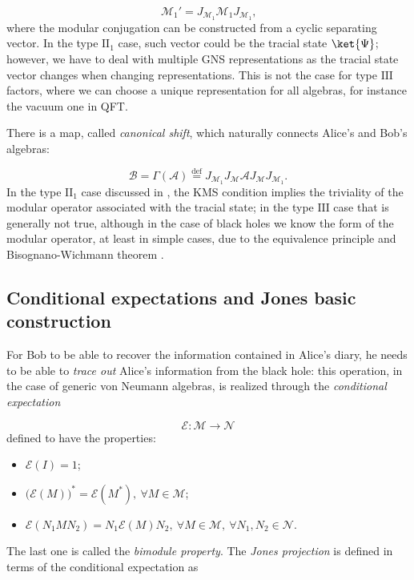 \documentclass[a4paper,11pt]{article}
\newcommand{\eqdef}{\overset{\mathrm{def}}{=}}
\begin{document}
\begin{equation}
    \mathcal{M}_1' = J_{\mathcal{M}_1} \mathcal{M}_1 J_{\mathcal{M}_1} \text{,}
    \label{M1 and M1'}
\end{equation}
%
where the modular conjugation can be constructed from a cyclic separating vector. In the type $\mathrm{II}_1$ case, such vector could be the tracial state $\ket{\Psi}$; however, we have to deal with multiple GNS representations as the tracial state vector changes when changing representations. This is not the case for type $\mathrm{III}$ factors, where we can choose a unique representation for all algebras, for instance the vacuum one in QFT.

There is a map, called \textit{canonical shift}, which naturally connects Alice's and Bob's algebras:

\begin{equation}
    \mathcal{B} = \Gamma (\mathcal{A}) \eqdef J_{\mathcal{M}_1} J_{\mathcal{M}} \mathcal{A} J_{\mathcal{M}} J_{\mathcal{M}_1} \text{.}
\end{equation}
%
In the type $\mathrm{II}_1$ case discussed in \cite{Verlinde}, the KMS condition implies the triviality of the modular operator associated with the tracial state; in the type $\mathrm{III}$ case that is generally not true, although in the case of black holes we know the form of the modular operator, at least in simple cases, due to the equivalence principle and Bisognano-Wichmann theorem \cite{Bisognano-Wichmann} \cite{Sewell}.

\subsection{Conditional expectations and Jones basic construction}

For Bob to be able to recover the information contained in Alice's diary, he needs to be able to \textit{trace out} Alice's information from the black hole: this operation, in the case of generic von Neumann algebras, is realized through the \textit{conditional expectation}

\begin{equation}
    \mathcal{E} : \mathcal{M} \rightarrow \mathcal{N}
\end{equation}
%
defined to have the properties:

\begin{itemize}
    \item $\mathcal{E}(I) = 1$;
    \item $\big( \mathcal{E}(M) \big)^* = \mathcal{E}(M^*), \ \forall M \in \mathcal{M}$;
    \item $\mathcal{E}(N_1 M N_2) = N_1 \mathcal{E}(M) N_2, \ \forall M \in \mathcal{M}, \ \forall N_1, N_2 \in \mathcal{N}$.
\end{itemize}
%
The last one is called the \textit{bimodule property}. The \textit{Jones projection} is defined in terms of the conditional expectation as
\end{document}
